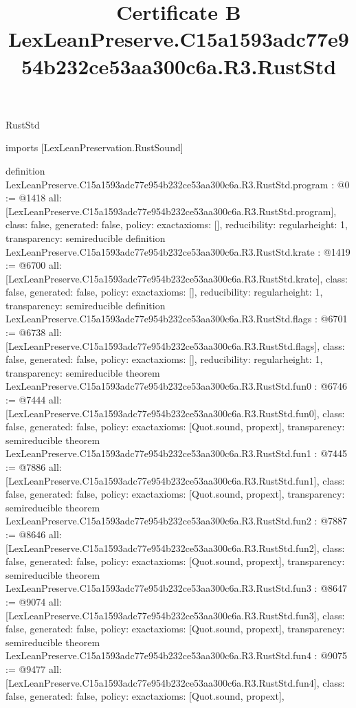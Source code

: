 \begin{lexlean}{RustStd}
\title{Certificate B LexLeanPreserve.C15a1593adc77e954b232ce53aa300c6a.R3.RustStd}
\begin{coremodule}
imports [LexLeanPreservation.RustSound]

definition LexLeanPreserve.C15a1593adc77e954b232ce53aa300c6a.R3.RustStd.program : @0 := @1418 {
  all: [LexLeanPreserve.C15a1593adc77e954b232ce53aa300c6a.R3.RustStd.program],
  class: false,
  generated: false,
  policy: exact{axioms: []},
  reducibility: regular{height: 1},
  transparency: semireducible
}
definition LexLeanPreserve.C15a1593adc77e954b232ce53aa300c6a.R3.RustStd.krate : @1419 := @6700 {
  all: [LexLeanPreserve.C15a1593adc77e954b232ce53aa300c6a.R3.RustStd.krate],
  class: false,
  generated: false,
  policy: exact{axioms: []},
  reducibility: regular{height: 1},
  transparency: semireducible
}
definition LexLeanPreserve.C15a1593adc77e954b232ce53aa300c6a.R3.RustStd.flags : @6701 := @6738 {
  all: [LexLeanPreserve.C15a1593adc77e954b232ce53aa300c6a.R3.RustStd.flags],
  class: false,
  generated: false,
  policy: exact{axioms: []},
  reducibility: regular{height: 1},
  transparency: semireducible
}
theorem LexLeanPreserve.C15a1593adc77e954b232ce53aa300c6a.R3.RustStd.fun0 : @6746 := @7444 {
  all: [LexLeanPreserve.C15a1593adc77e954b232ce53aa300c6a.R3.RustStd.fun0],
  class: false,
  generated: false,
  policy: exact{axioms: [Quot.sound, propext]},
  transparency: semireducible
}
theorem LexLeanPreserve.C15a1593adc77e954b232ce53aa300c6a.R3.RustStd.fun1 : @7445 := @7886 {
  all: [LexLeanPreserve.C15a1593adc77e954b232ce53aa300c6a.R3.RustStd.fun1],
  class: false,
  generated: false,
  policy: exact{axioms: [Quot.sound, propext]},
  transparency: semireducible
}
theorem LexLeanPreserve.C15a1593adc77e954b232ce53aa300c6a.R3.RustStd.fun2 : @7887 := @8646 {
  all: [LexLeanPreserve.C15a1593adc77e954b232ce53aa300c6a.R3.RustStd.fun2],
  class: false,
  generated: false,
  policy: exact{axioms: [Quot.sound, propext]},
  transparency: semireducible
}
theorem LexLeanPreserve.C15a1593adc77e954b232ce53aa300c6a.R3.RustStd.fun3 : @8647 := @9074 {
  all: [LexLeanPreserve.C15a1593adc77e954b232ce53aa300c6a.R3.RustStd.fun3],
  class: false,
  generated: false,
  policy: exact{axioms: [Quot.sound, propext]},
  transparency: semireducible
}
theorem LexLeanPreserve.C15a1593adc77e954b232ce53aa300c6a.R3.RustStd.fun4 : @9075 := @9477 {
  all: [LexLeanPreserve.C15a1593adc77e954b232ce53aa300c6a.R3.RustStd.fun4],
  class: false,
  generated: false,
  policy: exact{axioms: [Quot.sound, propext]},
}
\end{coremodule}
\end{lexlean}
